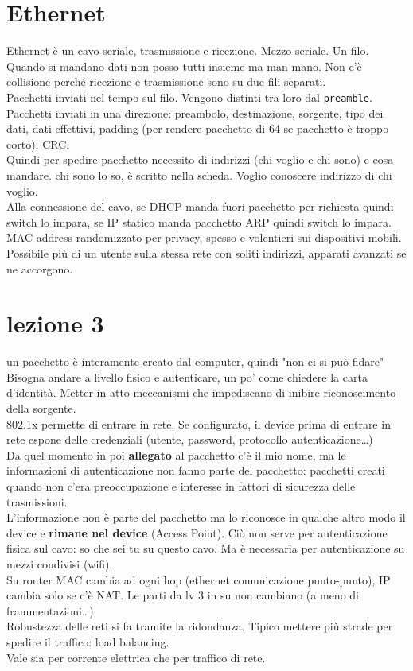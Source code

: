 \documentclass[10pt]{book}
\begin{document}
\section{Ethernet}
Ethernet è un cavo seriale, trasmissione e ricezione. Mezzo seriale. Un filo.\\
Quando si mandano dati non posso tutti insieme ma man mano. Non c'è collisione perché ricezione e trasmissione sono su due fili separati.\\
Pacchetti inviati nel tempo sul filo. Vengono distinti tra loro dal \texttt{preamble}. Pacchetti inviati in una direzione: preambolo, destinazione, sorgente, tipo dei dati, dati effettivi, padding (per rendere pacchetto di 64 se pacchetto è troppo corto), CRC.\\
Quindi per spedire pacchetto necessito di indirizzi (chi voglio e chi sono) e cosa mandare. chi sono lo so, è scritto nella scheda. Voglio conoscere indirizzo di chi voglio.\\
Alla connessione del cavo, se DHCP manda fuori pacchetto per richiesta quindi switch lo impara, se IP statico manda pacchetto ARP quindi switch lo impara.\\
MAC address randomizzato per privacy, spesso e volentieri sui dispositivi mobili.\\
Possibile più di un utente sulla stessa rete con soliti indirizzi, apparati avanzati se ne accorgono.
\section{lezione 3}
un pacchetto è interamente creato dal computer, quindi "non ci si può fidare"\\
Bisogna andare a livello fisico e autenticare, un po' come chiedere la carta d'identità. Metter in atto meccanismi che impediscano di inibire riconoscimento della sorgente.\\
802.1x permette di entrare in rete. Se configurato, il device prima di entrare in rete espone delle credenziali (utente, password, protocollo autenticazione\ldots)\\
Da quel momento in poi \textbf{allegato} al pacchetto c'è il mio nome, ma le informazioni di autenticazione non fanno parte del pacchetto: pacchetti creati quando non c'era preoccupazione e interesse in fattori di sicurezza delle trasmissioni.\\
L'informazione non è parte del pacchetto ma lo riconosce in qualche altro modo il device e \textbf{rimane nel device} (Access Point). Ciò non serve per autenticazione fisica sul cavo: so che sei tu su questo cavo. Ma è necessaria per autenticazione su mezzi condivisi (wifi).\\
Su router MAC cambia ad ogni hop (ethernet comunicazione punto-punto), IP cambia solo se c'è NAT. Le parti da lv 3 in su non cambiano (a meno di frammentazioni\ldots)\\
Robustezza delle reti si fa tramite la ridondanza. Tipico mettere più strade per spedire il traffico: load balancing.\\
Vale sia per corrente elettrica che per traffico di rete.\\\\
\end{document}
